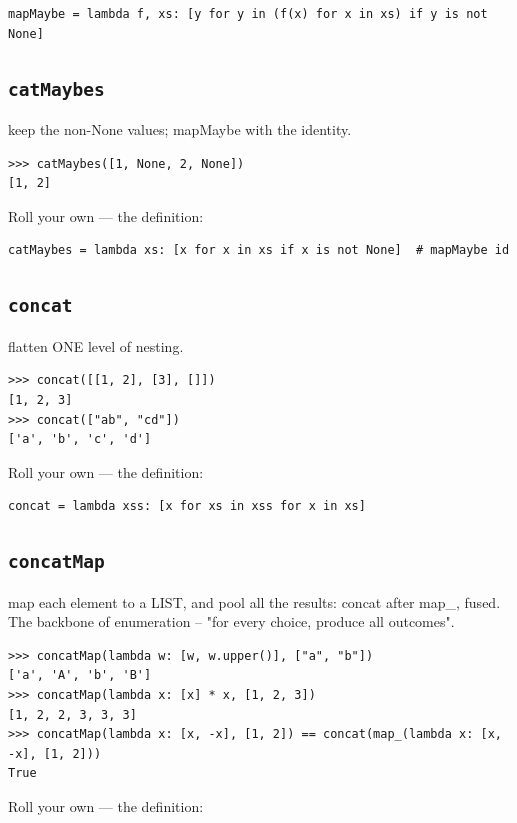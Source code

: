 \documentclass[10pt,letterpaper]{book}
\begin{document}
\begin{lstlisting}[style=ex]
mapMaybe = lambda f, xs: [y for y in (f(x) for x in xs) if y is not None]
\end{lstlisting}
\subsection{\texttt{catMaybes}}\label{def:catMaybes}
keep the non-None values; mapMaybe with the identity.
\begin{lstlisting}[style=ex]
>>> catMaybes([1, None, 2, None])
[1, 2]
\end{lstlisting}

Roll your own --- the definition:

\begin{lstlisting}[style=ex]
catMaybes = lambda xs: [x for x in xs if x is not None]  # mapMaybe id
\end{lstlisting}

\subsection{\texttt{concat}}\label{def:concat}
flatten ONE level of nesting.
\begin{lstlisting}[style=ex]
>>> concat([[1, 2], [3], []])
[1, 2, 3]
>>> concat(["ab", "cd"])
['a', 'b', 'c', 'd']
\end{lstlisting}

Roll your own --- the definition:

\begin{lstlisting}[style=ex]
concat = lambda xss: [x for xs in xss for x in xs]
\end{lstlisting}
\subsection{\texttt{concatMap}}\label{def:concatMap}
map each element to a LIST, and pool all the results: concat after map\_, fused. The backbone of enumeration -- "for every choice, produce all outcomes".
\begin{lstlisting}[style=ex]
>>> concatMap(lambda w: [w, w.upper()], ["a", "b"])
['a', 'A', 'b', 'B']
>>> concatMap(lambda x: [x] * x, [1, 2, 3])
[1, 2, 2, 3, 3, 3]
>>> concatMap(lambda x: [x, -x], [1, 2]) == concat(map_(lambda x: [x, -x], [1, 2]))
True
\end{lstlisting}

Roll your own --- the definition:
\end{document}
